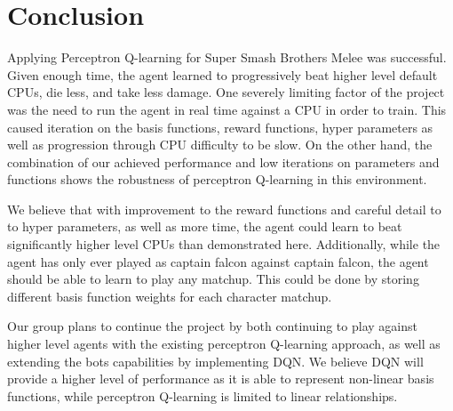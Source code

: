 \section{Conclusion}

Applying Perceptron Q-learning for Super Smash Brothers Melee was successful. Given enough time, the agent learned to progressively beat higher level default CPUs, die less, and take less damage. One severely limiting factor of the project was the need to run the agent in real time against a CPU in order to train. This caused iteration on the basis functions, reward functions, hyper parameters as well as progression through CPU difficulty to be slow. On the other hand, the combination of our achieved performance and low iterations on parameters and functions shows the robustness of perceptron Q-learning in this environment. 

We believe that with improvement to the reward functions and careful detail to to hyper parameters, as well as more time, the agent could learn to beat significantly higher level CPUs than demonstrated here. Additionally, while the agent has only ever played as captain falcon against captain falcon, the agent should be able to learn to play any matchup. This could be done by storing different basis function weights for each character matchup.

Our group plans to continue the project by both continuing to play against higher level agents with the existing perceptron Q-learning approach, as well as extending the bots capabilities by implementing DQN. We believe DQN will provide a higher level of performance as it is able to represent non-linear basis functions, while perceptron Q-learning is limited to linear relationships.

